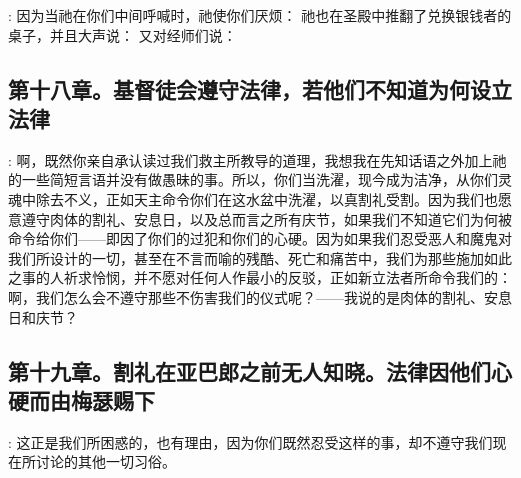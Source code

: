 : 因为当祂在你们中间呼喊时，祂使你们厌烦： 祂也在圣殿中推翻了兑换银钱者的桌子，并且大声说： 又对经师们说：\par


\subsection{第十八章。基督徒会遵守法律，若他们不知道为何设立法律}

: 啊，既然你亲自承认读过我们救主所教导的道理，我想我在先知话语之外加上祂的一些简短言语并没有做愚昧的事。所以，你们当洗濯，现今成为洁净，从你们灵魂中除去不义，正如天主命令你们在这水盆中洗濯，以真割礼受割。因为我们也愿意遵守肉体的割礼、安息日，以及总而言之所有庆节，如果我们不知道它们为何被命令给你们——即因了你们的过犯和你们的心硬。因为如果我们忍受恶人和魔鬼对我们所设计的一切，甚至在不言而喻的残酷、死亡和痛苦中，我们为那些施加如此之事的人祈求怜悯，并不愿对任何人作最小的反驳，正如新立法者所命令我们的：啊，我们怎么会不遵守那些不伤害我们的仪式呢？——我说的是肉体的割礼、安息日和庆节？\par


\subsection{第十九章。割礼在亚巴郎之前无人知晓。法律因他们心硬而由梅瑟赐下}

: 这正是我们所困惑的，也有理由，因为你们既然忍受这样的事，却不遵守我们现在所讨论的其他一切习俗。\par

